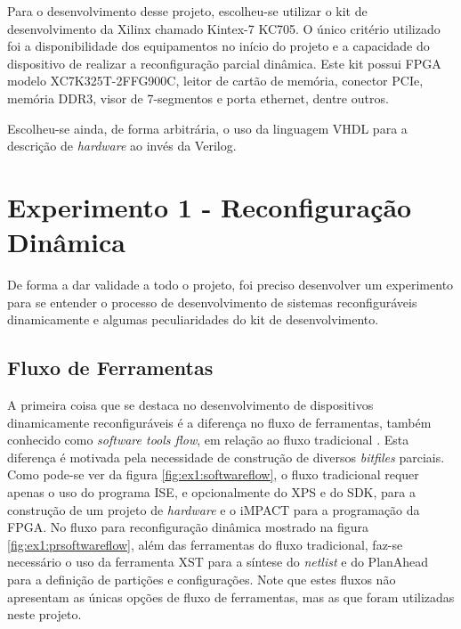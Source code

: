 \documentclass[11pt,a4paper,oneside]{book}
\begin{document}
Para o desenvolvimento desse projeto, escolheu-se utilizar o kit de desenvolvimento da Xilinx\textregistered{} chamado Kintex-7 KC705.
O único critério utilizado foi a disponibilidade dos equipamentos no início do projeto e a capacidade do dispositivo de realizar a reconfiguração parcial dinâmica.
Este kit possui FPGA modelo XC7K325T-2FFG900C, leitor de cartão de memória, conector PCIe\textregistered{}, memória DDR3, visor de 7-segmentos e porta ethernet, dentre outros.

Escolheu-se ainda, de forma arbitrária, o uso da linguagem VHDL para a descrição de \textit{hardware} ao invés da Verilog.

\section{Experimento 1 - Reconfiguração Dinâmica}
De forma a dar validade a todo o projeto, foi preciso desenvolver um experimento para se entender o processo de desenvolvimento de sistemas reconfiguráveis dinamicamente e algumas peculiaridades do kit de desenvolvimento.

\subsection{Fluxo de Ferramentas}
A primeira coisa que se destaca no desenvolvimento de dispositivos dinamicamente reconfiguráveis é a diferença no fluxo de ferramentas, também conhecido como \textit{software tools flow}, em relação ao fluxo tradicional \cite{ug743}.
Esta diferença é motivada pela necessidade de construção de diversos \textit{bitfiles} parciais.
Como pode-se ver da figura \ref{fig:ex1:softwareflow}, o fluxo tradicional requer apenas o uso do programa ISE, e opcionalmente do XPS e do SDK, para a construção de um projeto de \textit{hardware} e o iMPACT para a programação da FPGA.
No fluxo para reconfiguração dinâmica mostrado na figura \ref{fig:ex1:prsoftwareflow}, além das ferramentas do fluxo tradicional, faz-se necessário o uso da ferramenta XST para a síntese do \textit{netlist} e do PlanAhead para a definição de partições e configurações.
Note que estes fluxos não apresentam as únicas opções de fluxo de ferramentas, mas as que foram utilizadas neste projeto.
\end{document}
